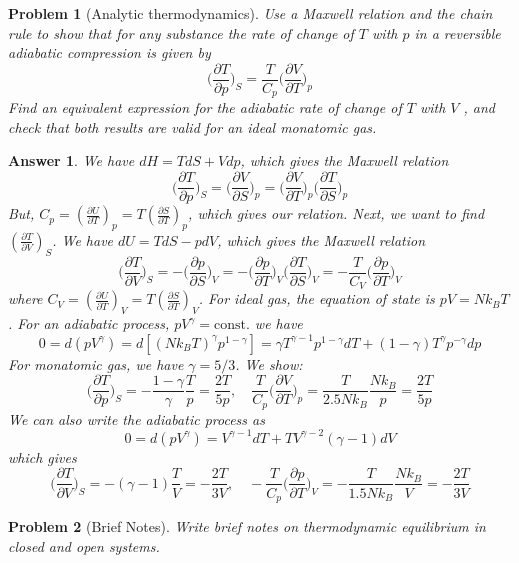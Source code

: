 \documentclass[a4paper]{article}
\newtheorem{ans}{Answer}[section]
\theoremstyle{new}
\newtheorem{qns}{Problem}[section]
\begin{document}
\newpage
\begin{qns}[Analytic thermodynamics]
Use a Maxwell relation and the chain rule to show that for any substance the rate of change of $T$ with $p$ in a reversible adiabatic compression is given by
$$\bigg(\frac{\partial T}{\partial p}\bigg)_S=\frac{T}{C_p}\bigg(\frac{\partial V}{\partial T}\bigg)_p$$
Find an equivalent expression for the adiabatic rate of change of $T$ with $V$ , and check that both results are valid for an ideal monatomic gas.
\end{qns}
\begin{ans}
We have $dH=TdS+Vdp$, which gives the Maxwell relation
$$\bigg(\frac{\partial T}{\partial p}\bigg)_S=\bigg(\frac{\partial V}{\partial S}\bigg)_p=\bigg(\frac{\partial V}{\partial T}\bigg)_p\bigg(\frac{\partial T}{\partial S}\bigg)_p$$
But, $C_p=(\frac{\partial U}{\partial T})_p=T(\frac{\partial S}{\partial T})_p$, which gives our relation. Next, we want to find $(\frac{\partial T}{\partial V})_S$. We have $dU=TdS-pdV$, which gives the Maxwell relation
$$\bigg(\frac{\partial T}{\partial V}\bigg)_S=-\bigg(\frac{\partial p}{\partial S}\bigg)_V=-\bigg(\frac{\partial p}{\partial T}\bigg)_V\bigg(\frac{\partial T}{\partial S}\bigg)_V=-\frac{T}{C_V}\bigg(\frac{\partial p}{\partial T}\bigg)_V$$
where $C_V=(\frac{\partial U}{\partial T})_V=T(\frac{\partial S}{\partial T})_V$. For ideal gas, the equation of state is $pV=Nk_BT$. For an adiabatic process, $pV^\gamma=\text{const.}$ we have
$$0=d(pV^\gamma)=d[(Nk_BT)^\gamma p^{1-\gamma}]=\gamma T^{\gamma-1}p^{1-\gamma}dT+(1-\gamma)T^\gamma p^{-\gamma}dp$$
For monatomic gas, we have $\gamma=5/3$. We show:
$$\bigg(\frac{\partial T}{\partial p}\bigg)_S=-\frac{1-\gamma}{\gamma}\frac{T}{p}=\frac{2T}{5p},\quad \frac{T}{C_p}\bigg(\frac{\partial V}{\partial T}\bigg)_p=\frac{T}{2.5Nk_B}\frac{Nk_B}{p}=\frac{2T}{5p}$$
We can also write the adiabatic process as
$$0=d(pV^\gamma)=V^{\gamma-1}dT+TV^{\gamma-2}(\gamma-1)dV$$
which gives
$$\bigg(\frac{\partial T}{\partial V}\bigg)_S=-(\gamma-1)\frac{T}{V}=-\frac{2T}{3V},\quad -\frac{T}{C_p}\bigg(\frac{\partial p}{\partial T}\bigg)_V=-\frac{T}{1.5Nk_B}\frac{Nk_B}{V}=-\frac{2T}{3V}$$
\end{ans}
\begin{qns}[Brief Notes]
Write brief notes on thermodynamic equilibrium in closed and open systems.
\end{qns}
\end{document}
